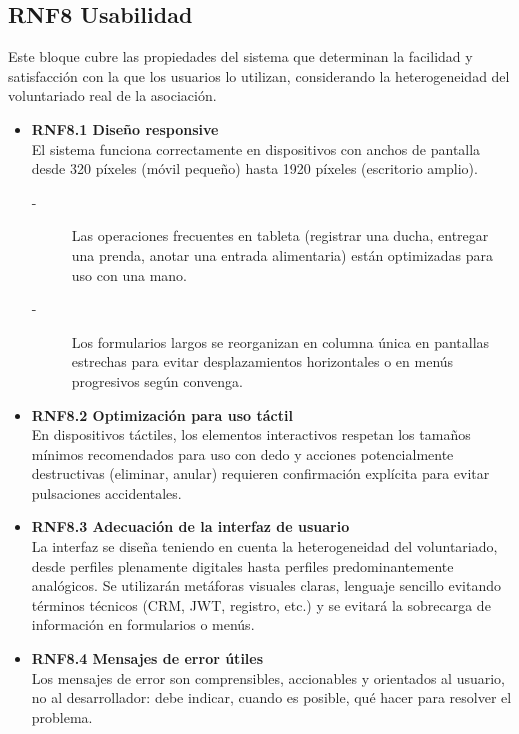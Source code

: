 \subsection{RNF8 Usabilidad}
Este bloque cubre las propiedades del sistema que determinan la
facilidad y satisfacción con la que los usuarios lo utilizan,
considerando la heterogeneidad del voluntariado real de la asociación.
\begin{itemize}
    \item \textbf{RNF8.1 Diseño responsive} \\
    El sistema funciona correctamente en dispositivos con anchos de
    pantalla desde 320 píxeles (móvil pequeño) hasta 1920 píxeles
    (escritorio amplio).
    \begin{description}
        \item[-] Las operaciones frecuentes en tableta (registrar una ducha,
        entregar una prenda, anotar una entrada alimentaria) están
        optimizadas para uso con una mano. 
        \item[-] Los formularios largos se reorganizan en columna única en
        pantallas estrechas para evitar desplazamientos horizontales o en menús progresivos según convenga.
    \end{description}


    \item \textbf{RNF8.2 Optimización para uso táctil} \\
    En dispositivos táctiles, los elementos interactivos respetan los
    tamaños mínimos recomendados para uso con dedo y acciones potencialmente destructivas (eliminar, anular)
    requieren confirmación explícita para evitar pulsaciones
    accidentales.


    \item \textbf{RNF8.3 Adecuación de la interfaz de usuario} \\
    La interfaz se diseña teniendo en cuenta la heterogeneidad del
    voluntariado, desde perfiles plenamente digitales hasta perfiles
    predominantemente analógicos. Se utilizarán metáforas visuales claras, 
    lenguaje sencillo evitando términos técnicos (CRM, JWT, registro, etc.) 
    y se evitará la sobrecarga de información en formularios o menús.


    \item \textbf{RNF8.4 Mensajes de error útiles} \\
    Los mensajes de error son comprensibles, accionables y orientados
    al usuario, no al desarrollador: debe indicar, cuando es posible, qué hacer para resolver
    el problema.



\end{itemize}
